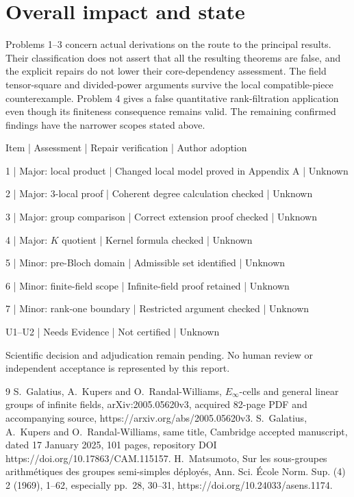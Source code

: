 \documentclass[10pt]{article}
\begin{document}
\section*{Overall impact and state}
Problems 1–3 concern actual derivations on the route to the principal results. Their classification does not assert that all the resulting theorems are false, and the explicit repairs do not lower their core-dependency assessment. The field tensor-square and divided-power arguments survive the local compatible-piece counterexample. Problem 4 gives a false quantitative rank-filtration application even though its finiteness consequence remains valid. The remaining confirmed findings have the narrower scopes stated above.\par
Item | Assessment | Repair verification | Author adoption\par
1 | Major: local product | Changed local model proved in Appendix A | Unknown\par
2 | Major: \(3\)-local proof | Coherent degree calculation checked | Unknown\par
3 | Major: group comparison | Correct extension proof checked | Unknown\par
4 | Major: \(K\) quotient | Kernel formula checked | Unknown\par
5 | Minor: pre-Bloch domain | Admissible set identified | Unknown\par
6 | Minor: finite-field scope | Infinite-field proof retained | Unknown\par
7 | Minor: rank-one boundary | Restricted argument checked | Unknown\par
U1–U2 | Needs Evidence | Not certified | Unknown\par
Scientific decision and adjudication remain pending. No human review or independent acceptance is represented by this report.\par
9 S. Galatius, A. Kupers and O. Randal-Williams, \(E_\infty\)-cells and general linear groups of infinite fields, arXiv:2005.05620v3, acquired 82-page PDF and accompanying source, https://arxiv.org/abs/2005.05620v3. S. Galatius, A. Kupers and O. Randal-Williams, same title, Cambridge accepted manuscript, dated 17 January 2025, 101 pages, repository DOI https://doi.org/10.17863/CAM.115157. H. Matsumoto, Sur les sous-groupes arithmétiques des groupes semi-simples déployés, Ann. Sci. École Norm. Sup. (4) 2 (1969), 1–62, especially pp. 28, 30–31, https://doi.org/10.24033/asens.1174.\par
\end{document}
